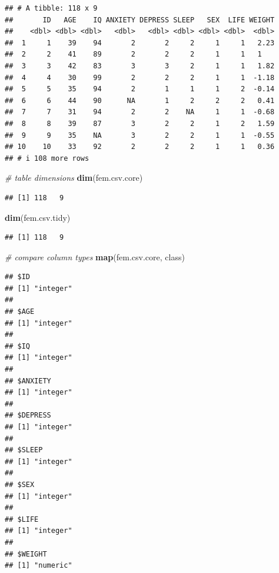 \documentclass[
]{book}
\newenvironment{Shaded}{\begin{snugshade}}{\end{snugshade}}
\newcommand{\CommentTok}[1]{\textcolor[rgb]{0.56,0.35,0.01}{\textit{#1}}}
\newcommand{\FunctionTok}[1]{\textcolor[rgb]{0.13,0.29,0.53}{\textbf{#1}}}
\newcommand{\NormalTok}[1]{#1}
\theoremstyle{definition}
\theoremstyle{definition}
\theoremstyle{definition}
\theoremstyle{definition}
\theoremstyle{remark}
\begin{document}
\begin{verbatim}
## # A tibble: 118 x 9
##       ID   AGE    IQ ANXIETY DEPRESS SLEEP   SEX  LIFE WEIGHT
##    <dbl> <dbl> <dbl>   <dbl>   <dbl> <dbl> <dbl> <dbl>  <dbl>
##  1     1    39    94       2       2     2     1     1   2.23
##  2     2    41    89       2       2     2     1     1   1   
##  3     3    42    83       3       3     2     1     1   1.82
##  4     4    30    99       2       2     2     1     1  -1.18
##  5     5    35    94       2       1     1     1     2  -0.14
##  6     6    44    90      NA       1     2     2     2   0.41
##  7     7    31    94       2       2    NA     1     1  -0.68
##  8     8    39    87       3       2     2     1     2   1.59
##  9     9    35    NA       3       2     2     1     1  -0.55
## 10    10    33    92       2       2     2     1     1   0.36
## # i 108 more rows
\end{verbatim}

\begin{Shaded}
\begin{Highlighting}[]
\CommentTok{\# table dimensions}
\FunctionTok{dim}\NormalTok{(fem.csv.core)}
\end{Highlighting}
\end{Shaded}

\begin{verbatim}
## [1] 118   9
\end{verbatim}

\begin{Shaded}
\begin{Highlighting}[]
\FunctionTok{dim}\NormalTok{(fem.csv.tidy)}
\end{Highlighting}
\end{Shaded}

\begin{verbatim}
## [1] 118   9
\end{verbatim}

\begin{Shaded}
\begin{Highlighting}[]
\CommentTok{\# compare column types}
\FunctionTok{map}\NormalTok{(fem.csv.core, class)}
\end{Highlighting}
\end{Shaded}

\begin{verbatim}
## $ID
## [1] "integer"
## 
## $AGE
## [1] "integer"
## 
## $IQ
## [1] "integer"
## 
## $ANXIETY
## [1] "integer"
## 
## $DEPRESS
## [1] "integer"
## 
## $SLEEP
## [1] "integer"
## 
## $SEX
## [1] "integer"
## 
## $LIFE
## [1] "integer"
## 
## $WEIGHT
## [1] "numeric"
\end{verbatim}
\end{document}
